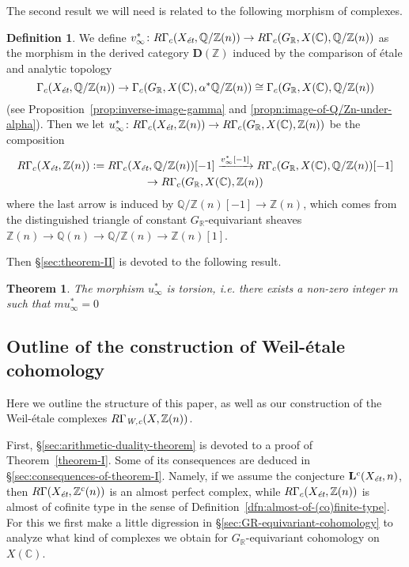 \documentclass[leqno,12pt]{article}
\theoremstyle{plain}
\newtheorem{maintheorem}{Theorem}
\theoremstyle{definition}
\newtheorem{definition}[theorem]{\indent\sc Definition}
\newcommand{\CC}{\mathbb{C}}
\newcommand{\QQ}{\mathbb{Q}}
\newcommand{\RR}{\mathbb{R}}
\newcommand{\ZZ}{\mathbb{Z}}
\newcommand{\dfn}{\mathrel{\mathop:}=}
\newcommand{\Wc}{\text{\it W,c}}
\newcommand{\et}{\text{\it \'{e}t}}
\newcommand{\DZ}{{\mathbf{D} (\ZZ)}}
\begin{document}
The second result we will need is related to the following morphism of
complexes.

\begin{definition}
  \label{dfn:u-infty}
  We define
  $v_\infty^*\colon R\Gamma_c (X_\et, \QQ/\ZZ (n)) \to R\Gamma_c (G_\RR, X
  (\CC), \QQ/\ZZ (n))$ as the morphism in the derived category $\DZ$ induced by
  the comparison of \'{e}tale and analytic topology
  \[ \Gamma_c (X_\et, \QQ/\ZZ (n)) \to
  \Gamma_c (G_\RR, X (\CC), \alpha^* \QQ/\ZZ (n)) \cong
  \Gamma_c (G_\RR, X (\CC), \QQ/\ZZ (n)) \]
  (see Proposition~\ref{prop:inverse-image-gamma} and
  \ref{propn:image-of-Q/Zn-under-alpha}). Then we let
  $u_\infty^*\colon R\Gamma_c (X_\et, \ZZ(n)) \to R\Gamma_c (G_\RR, X (\CC), \ZZ (n))$
  be the composition
  \begin{multline*}
    R\Gamma_c (X_\et, \ZZ(n)) \dfn R\Gamma_c (X_\et, \QQ/\ZZ (n)) [-1]
    \xrightarrow{v_\infty^* [-1]} R\Gamma_c (G_\RR, X (\CC), \QQ/\ZZ (n)) [-1]
    \\ \to R\Gamma_c (G_\RR, X (\CC), \ZZ (n))
  \end{multline*}
  where the last arrow is induced by $\QQ/\ZZ (n) [-1] \to \ZZ (n)$, which comes
  from the distinguished triangle of constant $G_\RR$-equivariant sheaves
  $\ZZ (n) \to \QQ (n) \to \QQ/\ZZ (n) \to \ZZ (n) [1]$.
\end{definition}

Then \S\ref{sec:theorem-II} is devoted to the following result.

\begin{maintheorem}
  \label{theorem-II}
  The morphism $u_\infty^*$ is torsion, i.e. there exists a non-zero integer $m$
  such that $mu^*_\infty = 0$
\end{maintheorem}

\subsection*{Outline of the construction of Weil-\'{e}tale cohomology}

Here we outline the structure of this paper, as well as our construction of the
Weil-\'{e}tale complexes $R\Gamma_\Wc (X, \ZZ (n))$.

First, \S\ref{sec:arithmetic-duality-theorem} is devoted to a proof of
Theorem~\ref{theorem-I}. Some of its consequences are deduced in
\S\ref{sec:consequences-of-theorem-I}. Namely, if we assume the conjecture
$\mathbf{L}^c (X_\et, n)$, then $R\Gamma (X_\et, \ZZ^c (n))$ is an almost
perfect complex, while $R\Gamma_c (X_\et, \ZZ (n))$ is almost of cofinite type
in the sense of Definition~\ref{dfn:almost-of-(co)finite-type}. For this we
first make a little digression in \S\ref{sec:GR-equivariant-cohomology} to
analyze what kind of complexes we obtain for $G_\RR$-equivariant cohomology on
$X (\CC)$.
\end{document}
